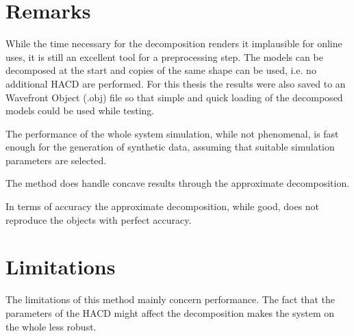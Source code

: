 


\section{Remarks}
While the time necessary for the decomposition renders it implausible for online uses,
it is still an excellent tool for a preprocessing step.
The models can be
decomposed at the start and copies of the same shape can be used, i.e. no additional
HACD are performed. For this thesis the results were also saved to an Wavefront Object (.obj) file so that simple and quick
 loading of the decomposed models could be used while testing.

The performance of the whole system simulation, while not phenomenal, is fast enough
for the generation of synthetic data, assuming that suitable simulation parameters
are selected.

The method does handle concave results through the approximate decomposition.

In terms of accuracy the approximate decomposition, while good, does not reproduce the objects
with perfect accuracy.


\section{Limitations}
The limitations of this method mainly concern performance. The fact
that the parameters of the HACD might affect the decomposition makes the system
on the whole less robust.
